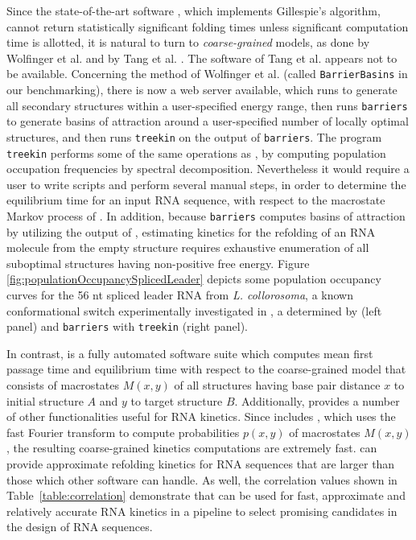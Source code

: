 Since the state-of-the-art software \kinfold, which implements
Gillespie's algorithm, cannot return statistically significant folding
times unless significant computation time is allotted, it is natural
to turn to {\em coarse-grained} models, as done by
Wolfinger et al. \cite{wolfingerStadler:kinetics} and by
Tang et al. \cite{Tang.jmb08}.  The software of Tang et al. appears not
to be available. Concerning the
method of Wolfinger et al. (called {\tt BarrierBasins} in our benchmarking),
there is now a web server available, which runs \rnasub
\cite{Wuchty.b99} to generate all secondary structures within a user-specified
energy range, then runs {\tt barriers} \cite{flammHofacker} to generate
basins of attraction around a user-specified number of locally optimal
structures, and then runs {\tt treekin} on the output of {\tt barriers}.
The program {\tt treekin} performs some of the same operations as \hermes,
by computing population occupation frequencies by spectral decomposition.
Nevertheless it would require a user to write scripts and perform
several manual steps, in order to determine the equilibrium time for
an input RNA sequence, with respect to the macrostate Markov process
of \cite{wolfingerStadler:kinetics}. In addition, because {\tt barriers} computes
basins of attraction by utilizing the output of \rnasub, estimating kinetics for the
refolding of an RNA molecule from the empty structure requires exhaustive enumeration
of all suboptimal structures having non-positive free energy.
Figure \ref{fig:populationOccupancySplicedLeader} depicts some population
occupancy curves for the 56 nt spliced leader RNA from
{\em L. collorosoma}, a known conformational switch experimentally
investigated in \cite{lecuyerCrothers}, a determined by
\hermes (left panel) and {\tt barriers} with {\tt treekin}
(right panel).

In contrast, \hermes is a fully automated software suite which
computes mean first passage time and equilibrium time with respect to
the coarse-grained model that consists of macrostates $M(x,y)$ of all
structures having base pair distance $x$ to initial structure $A$ and
$y$ to target structure $B$. Additionally, \hermes provides
a number of other functionalities useful for RNA kinetics. Since
\hermes includes \ffttwo, which uses the fast Fourier transform
to compute probabilities $p(x,y)$ of macrostates $M(x,y)$, the resulting
coarse-grained kinetics computations are extremely fast. \hermes
can provide approximate refolding kinetics for RNA sequences that are
larger than those which other software can handle. As well, the
correlation values shown in Table~\ref{table:correlation}
demonstrate that \hermes can be used for fast, approximate and relatively
accurate RNA kinetics in a pipeline to select promising candidates in
the design of RNA sequences.


